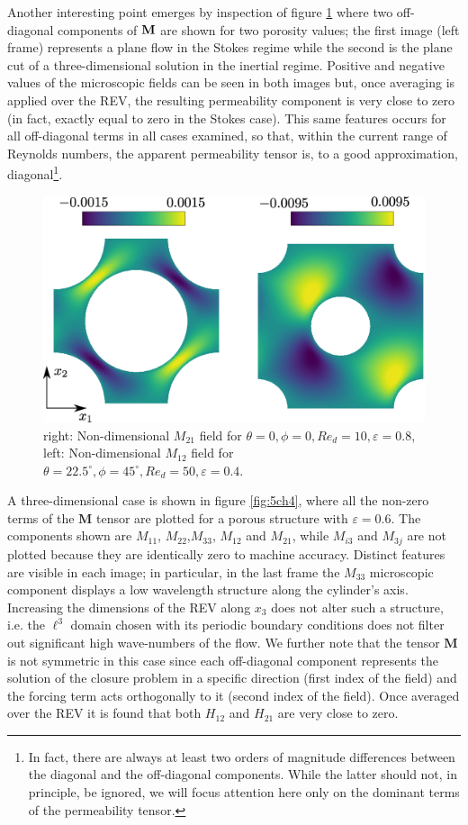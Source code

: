 Another interesting point emerges by inspection of  figure \ref{fig:3ch4} where two off-diagonal components of $\bf{M}$ are shown for two porosity 
values; the first image (left frame) represents a plane flow in the Stokes regime while the second is the plane cut of a three-dimensional 
solution in the inertial regime. Positive and negative values of the microscopic fields can be seen in both images but, once averaging is 
applied over the REV, the resulting permeability component is very close to zero (in fact, exactly equal to zero in the Stokes case).  This same features occurs for all off-diagonal terms in all cases examined, so that, within the current range of Reynolds numbers, the 
apparent permeability tensor is, to a good approximation, diagonal\footnote{In fact, there are always at least two orders of magnitude 
	differences between the diagonal and the off-diagonal components. While the latter should not, in principle, be ignored, we will focus attention 
	here only on the dominant terms of the permeability tensor.}.


\begin{figure}[H]
	\centering
	\includegraphics[width=0.8	\textwidth]{chapter_4/figure/fig3}
	\caption{right: Non-dimensional $M_{21}$ field for $\theta=0, \phi=0, Re_d=10, \varepsilon=0.8$, left: Non-dimensional $M_{12}$ field for $\theta=22.5^{\circ}, \phi=45^{\circ}, Re_d=50, \varepsilon=0.4$.}
	\label{fig:3ch4}
\end{figure}

A three-dimensional case is shown in  figure \ref{fig:5ch4}, where all the non-zero terms of the $\mathbf{M}$ tensor are plotted for a porous
structure with $\varepsilon=0.6$. The components shown are $M_{11}$, $M_{22}$,$M_{33}$, $M_{12}$ and $M_{21}$, while $M_{i3}$ and $M_{3j}$ are 
not plotted because they are identically zero to machine accuracy. Distinct features are visible in each image; in particular, in the last 
frame the $M_{33}$ microscopic component displays a low wavelength structure along the cylinder's axis. Increasing the dimensions of the REV 
along $x_3$ does not alter such a structure, i.e. the $\ell^3$ domain chosen with its periodic boundary conditions does not filter out 
significant high wave-numbers of the flow. We further note that the tensor $\mathbf{M}$ is not symmetric in this case since each off-diagonal component 
represents the solution of the closure problem in a specific direction (first index of the field) and the forcing term acts orthogonally to it
(second index of the field).  Once averaged over the REV it is found that both $H_{12}$ and $H_{21}$ are very close to zero.  


